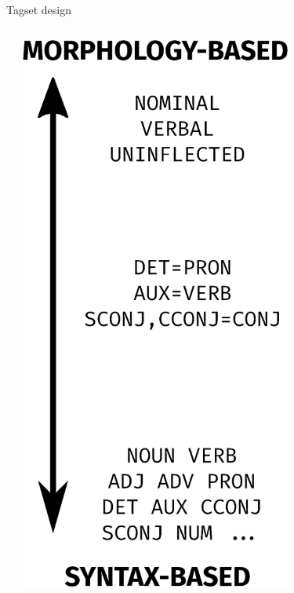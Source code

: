 \documentclass{beamer}
\begin{document}
\begin{frame}{Tagset design}
\begin{columns}
\begin{column}{0.6\textwidth}
\end{column}
\begin{column}{0.4\textwidth}
\begin{center}
\includegraphics[width=0.7\textwidth]{images/tagset.eps}
\end{center}

\end{column}
\end{columns}

% 

\end{frame}
\end{document}
